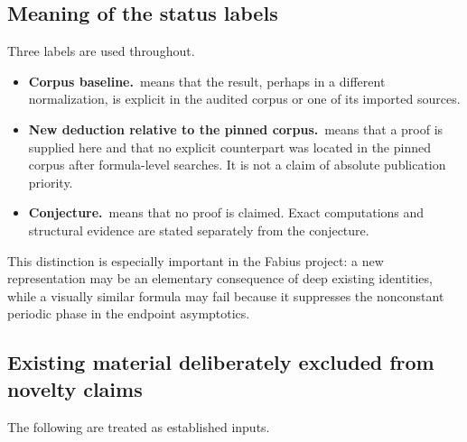\documentclass[11pt,oneside]{article}
\theoremstyle{definition}
\theoremstyle{remark}
\newcommand{\1}{\mathbf 1}
\newcommand{\baseline}{\textcolor{linkblue}{\textbf{Corpus baseline.}}\ }
\newcommand{\newresult}{\textcolor{newgreen}{\textbf{New deduction relative to the pinned corpus.}}\ }
\newcommand{\conjstatus}{\textcolor{conjecturepurple}{\textbf{Conjecture.}}\ }
\begin{document}
\subsection{Meaning of the status labels}

Three labels are used throughout.

\begin{itemize}
\item \baseline means that the result, perhaps in a different normalization,
      is explicit in the audited corpus or one of its imported sources.
\item \newresult means that a proof is supplied here and that no explicit
      counterpart was located in the pinned corpus after formula-level
      searches.  It is not a claim of absolute publication priority.
\item \conjstatus means that no proof is claimed.  Exact computations and
      structural evidence are stated separately from the conjecture.
\end{itemize}

This distinction is especially important in the Fabius project: a new
representation may be an elementary consequence of deep existing identities,
while a visually similar formula may fail because it suppresses the
nonconstant periodic phase in the endpoint asymptotics.

\subsection{Existing material deliberately excluded from novelty claims}

The following are treated as established inputs.
\end{document}
